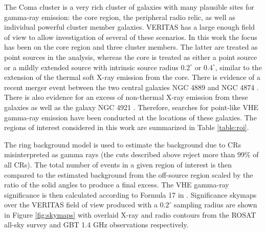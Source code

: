 \documentclass[12pt,manuscript]{aastex}
\begin{document}
The Coma cluster is a very rich cluster of galaxies with many plausible sites for gamma-ray
emission: the core region, the peripheral radio relic, as well as individual powerful cluster
member galaxies. VERITAS has a large enough field of view to allow investigation of several of
these scenarios. In this work the focus has been on the core region and three cluster members. The
latter are treated as point sources in the analysis, whereas the core is treated as either a point
source or a mildly extended source with intrinsic source radius $0.2^{\circ}$ or $0.4^{\circ}$,
similar to the extension of the thermal soft X-ray emission from the core. There
is evidence of a recent merger event between the two central galaxies NGC 4889 and NGC 4874
\citep{article:Tribble:1993}. There is also evidence for an excess of non-thermal X-ray emission
from these galaxies as well as the galaxy NGC 4921 \citep{article:Neumann_etal:2003}. Therefore,
searches for point-like VHE gamma-ray emission have been conducted at the locations of these
galaxies. The regions of interest considered in this work are summarized in Table \ref{table:roi}.

The ring background model \citep{article:Aharonian_etal:2001} is used to estimate the background
due to CRs misinterpreted as gamma rays (the cuts described above reject more than 99\% of all
CRs). The total number of events in a given region of interest is then compared to the estimated
background from the off-source region scaled by the ratio of the solid angles to produce a final
excess. The VHE gamma-ray significance is then calculated according to Formula 17 in
\citet{article:LiMa:1983}. Significance skymaps over the VERITAS field of view produced with a
$0.2^{\circ}$ sampling radius are shown in Figure \ref{fig:skymaps} with overlaid X-ray and radio
contours from the ROSAT all-sky survey \citep{article:BrielHenryBohringer:1992}  and GBT 1.4 GHz
observations \citep{article:BrownRudnick:2010} respectively.

%
%
\end{document}
